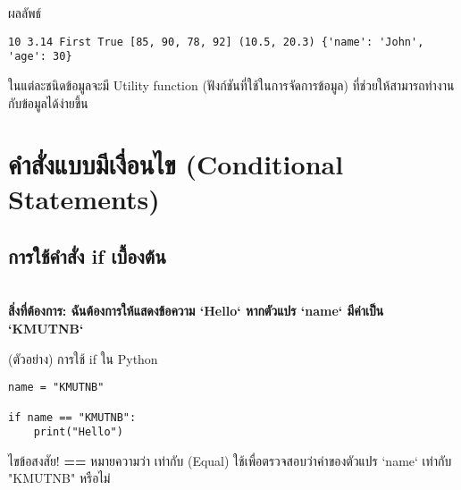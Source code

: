 \documentclass[12pt,a4paper]{article}
\newcommand{\textlight}[1]{{\thailightfont #1}}
\begin{document}
\begin{resultbox}{ผลลัพธ์}
\begin{verbatim}
10 3.14 First True [85, 90, 78, 92] (10.5, 20.3) {'name': 'John', 'age': 30}
\end{verbatim}
\end{resultbox}

\textlight{ในแต่ละชนิดข้อมูลจะมี Utility function (ฟังก์ชันที่ใช้ในการจัดการข้อมูล) ที่ช่วยให้สามารถทำงานกับข้อมูลได้ง่ายขึ้น}

\section{คำสั่งแบบมีเงื่อนไข (Conditional Statements)}

\hspace{1cm}\textlight{คำสั่งแบบมีเงื่อนไข (Conditional Statements) เป็นคำสั่งที่ใช้ในการตัดสินใจว่าควรทำอะไรต่อไปในโปรแกรมตามเงื่อนไขที่กำหนด คำสั่งเหล่านี้ช่วยให้โปรแกรมสามารถทำงานได้อย่างยืดหยุ่นและตอบสนองต่อสถานการณ์ต่างๆ (โค้ดด้านล่าง)}

\subsection{การใช้คำสั่ง if เบื้องต้น}

\hspace{1cm}\textlight{คำสั่ง if ใช้เพื่อตรวจสอบเงื่อนไข ถ้าเงื่อนไขเป็นจริง (True) จะทำการดำเนินการตามที่กำหนดไว้ในบล็อกของ if ดังกล่าว}\\
\textbf{สิ่งที่ต้องการ: ฉันต้องการให้แสดงข้อความ `Hello` หากตัวแปร `name` มีค่าเป็น `KMUTNB`}

\begin{codebox}{(ตัวอย่าง) การใช้ if ใน Python}
\begin{lstlisting}[style=python]
name = "KMUTNB"

if name == "KMUTNB":
    print("Hello")
\end{lstlisting}
\end{codebox}

\begin{answerbox}{ไขข้อสงสัย!}
\textlight{\textbf{==} หมายความว่า เท่ากับ (Equal) ใช้เพื่อตรวจสอบว่าค่าของตัวแปร `name` เท่ากับ "KMUTNB" หรือไม่}
\end{answerbox}
\end{document}
